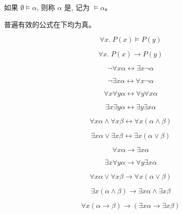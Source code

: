 \begin{frame}{}
  \begin{definition}
    如果 $\emptyset \models \alpha$, 则称 $\alpha$ 是,
    记为 $\models \alpha$。
  \end{definition}

  \vspace{0.60cm}
  \begin{center}
    普遍有效的公式在下均为真。

    \[
      \forall x.\; P(x) \models P(y)
    \]

    \[
      \forall x.\; P(x) \to P(y)
    \]
  \end{center}
\end{frame}

\begin{frame}{}
  \[
    \lnot \forall x \alpha \leftrightarrow \exists x \lnot \alpha
  \]

  \[
    \lnot \exists x \alpha \leftrightarrow \forall x \lnot \alpha
  \]
\end{frame}

\begin{frame}{}
  \[
    \forall x \forall y \alpha \leftrightarrow \forall y \forall x \alpha
  \]

  \[
    \exists x \exists y \alpha \leftrightarrow \exists y \exists x \alpha
  \]
\end{frame}

\begin{frame}{}
  \[
    \forall x \alpha \land \forall x \beta
      \leftrightarrow \forall x (\alpha \land \beta)
  \]

  \[
    \exists x \alpha \lor \exists x \beta
      \leftrightarrow \exists x (\alpha \lor \beta)
  \]
\end{frame}

\begin{frame}{}
  \[
    \forall x \alpha \to \exists x \alpha
  \]

  \[
    \exists x \forall y \alpha \to \forall y \exists x \alpha
  \]

  \pause
  \[
    \forall x \alpha \lor \forall x \beta \to \forall x (\alpha \lor \beta)
  \]

  \[
    \exists x (\alpha \land \beta) \to \exists x \alpha \land \exists x \beta
  \]

  \pause
  \[
    \forall x (\alpha \to \beta) \to (\exists x \alpha \to \exists x \beta)
  \]
\end{frame}

